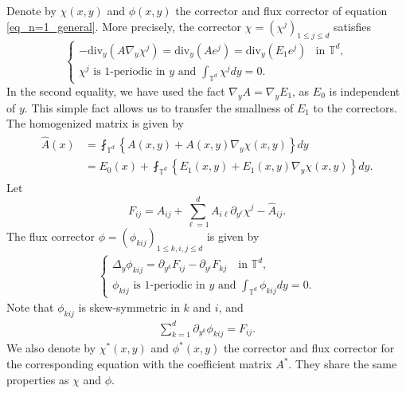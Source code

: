 \documentclass[reqno,12pt]{amsart} %
\theoremstyle{definition}
\theoremstyle{remark}
\numberwithin{equation}{section}
\begin{document}
Denote by $\chi(x, y)$ and $\phi(x, y)$ the corrector and flux corrector of equation \eqref{eq_n=1_general}. More precisely, the corrector $\chi=(\chi^j)_{1\le j\le d}$ satisfies 
\begin{equation}\label{eq_one-scale_chi}
  \begin{cases}
    -\mathrm{div}_y(A\nabla_y \chi^j)=\mathrm{div}_y(A e^j)=\mathrm{div}_y (E_1 e^j)&\text{in }\mathbb{T}^d,\\
    \chi^j\text{ is $1$-periodic in $y$ and }\int_{\mathbb{T}^d}\chi^j dy=0.
  \end{cases}
\end{equation}
In the second equality, we have used the fact $\nabla_y A = \nabla_y E_1$, as $E_0$ is independent of $y$. This simple fact allows us to transfer the smallness of $E_1$ to the correctors.
The homogenized matrix is given by
\begin{align}\label{n=1_def_hatA}
\begin{split}
    \widehat{A}(x) & = \fint_{\mathbb{T}^d} \left\{ A(x, y)+A(x, y)\nabla_{y}\chi(x, y) \right\} dy\\&=E_0(x)+\fint_{\mathbb{T}^d} \left\{ E_1(x, y)+E_1(x, y)\nabla_{y}\chi(x, y)\right\}  dy.
\end{split}
\end{align}
Let
\begin{equation}\label{F}
    F_{ij} = A_{ij}+ \sum_{\ell = 1}^d A_{i\ell}\partial_{y^\ell}\chi^j-\widehat{A}_{ij}.
\end{equation}
The flux corrector $\phi=(\phi_{kij})_{1\le k,i,j\le d}$ is given by
\begin{align}\label{eq.phi}
  \begin{cases}
    \Delta_y \phi_{kij}=\partial_{y^k} F_{ij} -\partial_{y^i}F_{kj} \quad \text{in }\mathbb{T}^d,\\
  \phi_{kij}\text{ is $1$-periodic in $y$ and }\int_{\mathbb{T}^d}\phi_{kij} dy=0. 
  \end{cases}
\end{align}
Note that $\phi_{kij}$ is skew-symmetric in $k$ and $i$, and
\begin{align}\label{conver_iden_flux}
\sum_{k=1}^d \partial_{y^k}\phi_{kij} = F_{ij}.
\end{align}
We also denote by $\chi^*(x, y)$ and $\phi^*(x, y)$ the corrector and flux corrector for the corresponding equation with the coefficient matrix $A^*$. They share the same properties as $\chi$ and $\phi$.
\end{document}
